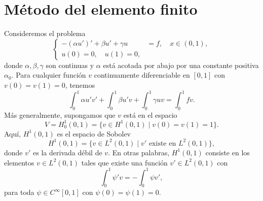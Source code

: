 \documentclass[11pt,letterpaper]{report}
\begin{document}
\section{Método del elemento finito}

Consideremos el problema
\begin{equation}
  \left\{
    \begin{aligned}
      -(\alpha u')' + \beta u' + \gamma u &= f, \quad x\in (0,1),
      \\
      u(0) = 0, \quad u(1) = 0, &
    \end{aligned}
  \right.
\end{equation}
donde $\alpha,\beta,\gamma$ son continuas y $\alpha$ está acotada por
abajo por una constante positiva $\alpha_0$.
Para cualquier función $v$ continuamente diferenciable en $[0,1]$ con
$v(0)=v(1)=0$, tenemos
\begin{equation}
       \int_0^{1} \alpha u'v' + \int_0^{1} \beta u'v + \int_0^{1} \gamma u v
      = \int_0^{1} fv
.\end{equation}
Más generalmente, supongamos que $v$ está en el espacio
\begin{equation}
  V
  = H^{1}_0(0,1)
  = \{ v \in H^{1}(0,1) \mid v(0)=v(1)=1 \}.
\end{equation}
Aquí, $H^{1}(0,1)$ es el espacio de Sobolev
\begin{equation}
  H^{1}(0,1)
  =
  \{v\in L^{2}(0,1) \mid v' \text{ existe en } L^{2}(0,1) \}
,\end{equation}
donde $v'$ es la derivada débil de $v$. En otras palabras,
$H^{1}(0,1)$ consiste en los elementos $v\in L^{2}(0,1)$ tales que
existe una función $v'\in L^{2}(0,1)$ con
\begin{equation}
    \int_{0}^{1} \psi' v
    =
    - \int_{0}^{1} \psi v'
,\end{equation}
para toda $\psi\in C^{\infty}[0,1]$ con $\psi(0)=\psi(1)=0$.
\end{document}

